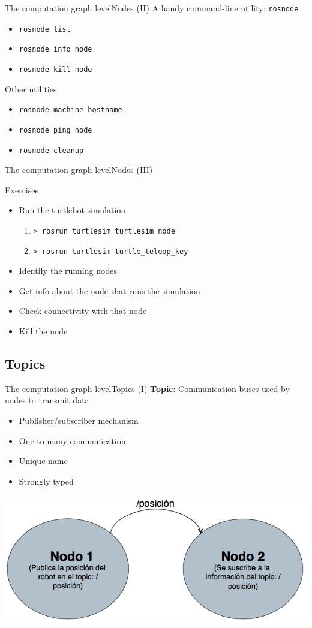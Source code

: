 \documentclass[10pt,compress]{beamer} %
\begin{document}
\begin{frame}{The computation graph level}{Nodes (II)}
	A handy command-line utility: \alert{\texttt{rosnode}}
  	\begin{itemize}
		\item \texttt{rosnode list}
		\item \texttt{rosnode info node}
		\item \texttt{rosnode kill node}
	\end{itemize}
	Other utilities
  	\begin{itemize}
		\item \texttt{rosnode machine hostname}
		\item \texttt{rosnode ping node}
		\item \texttt{rosnode cleanup}
	\end{itemize}
\end{frame}

\begin{frame}{The computation graph level}{Nodes (III)}
	\begin{block}{Exercises}
  	\begin{itemize}
		\item Run the turtlebot simulation
			\begin{enumerate}
			\item \texttt{> rosrun turtlesim turtlesim\_node}
			\item \texttt{> rosrun turtlesim turtle\_teleop\_key}
			\end{enumerate}
		\item Identify the running nodes
		\item Get info about the node that runs the simulation
		\item Check connectivity with that node
		\item Kill the node
	\end{itemize}
	\end{block}
\end{frame}

\subsection{Topics}
\begin{frame}{The computation graph level}{Topics (I)}
	\textbf{Topic}: Communication buses used by nodes to transmit data
	\begin{itemize}
	\item Publisher/subscriber mechanism
	\item One-to-many communication
	\item Unique name
	\item Strongly typed
	\end{itemize}
	\begin{center}
	\includegraphics[width=0.4\linewidth]{figs/topic1.png}
	\end{center}
\end{frame}
\end{document}
